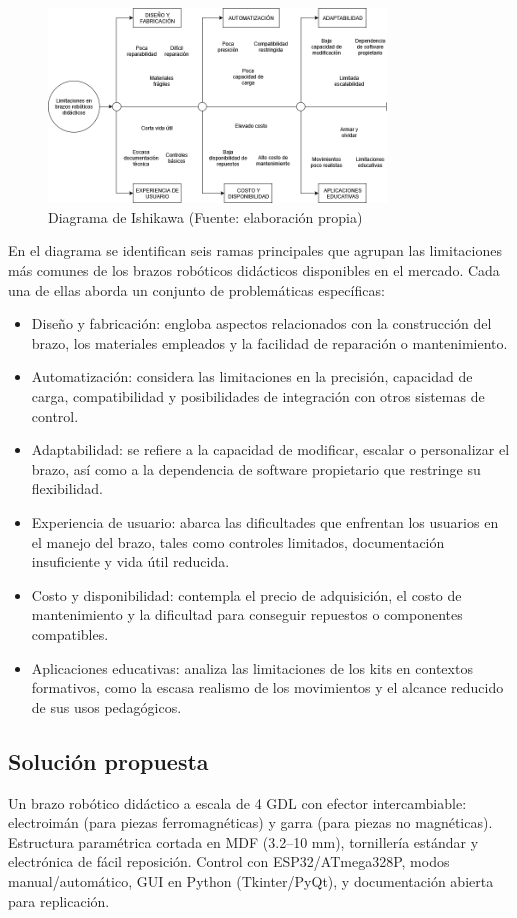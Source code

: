 \begin{figure}[h]
  \centering
  \includegraphics[width=0.8\textwidth]{anexos/Diagrama Ishikawa.png}
  \caption{Diagrama de Ishikawa (Fuente: elaboración propia)}\label{fig:Diagrama Ishikawa.}
\end{figure}
En el diagrama se identifican seis ramas principales que agrupan las limitaciones más comunes de los brazos robóticos didácticos disponibles en el mercado. Cada una de ellas aborda un conjunto de problemáticas específicas:
\begin{itemize}
  \item Diseño y fabricación: engloba aspectos relacionados con la construcción del brazo, los materiales empleados y la facilidad de reparación o mantenimiento.
  \item Automatización: considera las limitaciones en la precisión, capacidad de carga, compatibilidad y posibilidades de integración con otros sistemas de control.
  \item Adaptabilidad: se refiere a la capacidad de modificar, escalar o personalizar el brazo, así como a la dependencia de software propietario que restringe su flexibilidad.
  \item Experiencia de usuario: abarca las dificultades que enfrentan los usuarios en el manejo del brazo, tales como controles limitados, documentación insuficiente y vida útil reducida.
  \item Costo y disponibilidad: contempla el precio de adquisición, el costo de mantenimiento y la dificultad para conseguir repuestos o componentes compatibles.
  \item Aplicaciones educativas: analiza las limitaciones de los kits en contextos formativos, como la escasa realismo de los movimientos y el alcance reducido de sus usos pedagógicos.
\end{itemize}

\subsection{Solución propuesta}
Un brazo robótico didáctico a escala de 4 GDL con efector intercambiable: electroimán (para piezas ferromagnéticas) y garra (para piezas no magnéticas). Estructura paramétrica cortada en MDF (3.2–10 mm), tornillería estándar y electrónica de fácil reposición. Control con ESP32/ATmega328P, modos manual/automático, GUI en Python (Tkinter/PyQt), y documentación abierta para replicación.


